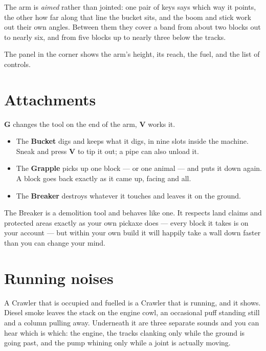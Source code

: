 The arm is \emph{aimed} rather than jointed: one pair of keys says which way it points, the other how
far along that line the bucket sits, and the boom and stick work out their own angles. Between them
they cover a band from about two blocks out to nearly six, and from five blocks up to nearly three
below the tracks.

\begin{ietip}
The panel in the corner shows the arm's height, its reach, the fuel, and the list of controls.
\end{ietip}

\section{Attachments}

\textbf{G} changes the tool on the end of the arm, \textbf{V} works it.

\begin{itemize}
\item The \textbf{Bucket} digs and keeps what it digs, in nine slots inside the machine. Sneak and
      press \textbf{V} to tip it out; a pipe can also unload it.
\item The \textbf{Grapple} picks up one block --- or one animal --- and puts it down again. A block
      goes back exactly as it came up, facing and all.
\item The \textbf{Breaker} destroys whatever it touches and leaves it on the ground.
\end{itemize}

\begin{iewarning}
The Breaker is a demolition tool and behaves like one. It respects land claims and protected areas
exactly as your own pickaxe does --- every block it takes is on your account --- but within your own
build it will happily take a wall down faster than you can change your mind.
\end{iewarning}

\section{Running noises}

A Crawler that is occupied and fuelled is a Crawler that is running, and it shows. Diesel smoke
leaves the stack on the engine cowl, an occasional puff standing still and a column pulling away.
Underneath it are three separate sounds and you can hear which is which: the engine, the tracks
clanking only while the ground is going past, and the pump whining only while a joint is actually
moving.

